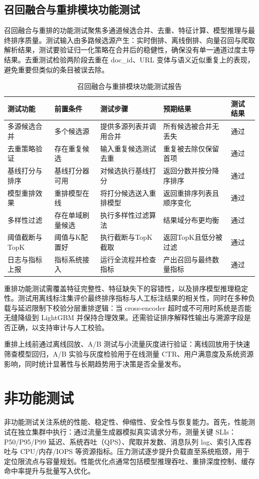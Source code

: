\subsection{召回融合与重排模块功能测试}
召回融合与重排的功能测试聚焦多通道候选合并、去重、特征计算、模型推理与最终排序质量。测试输入由多路候选源产生：实时倒排、离线倒排、向量召回与爬取解析结果，测试要验证归一化策略在合并后的稳健性，确保没有单一通道过度主导结果。去重测试检验两阶段去重在 doc\_id、URL 变体与语义近似重复上的表现，避免重要但类似的条目被误去除。
\begin{table}[htb]
\centering
\caption{召回融合与重排模块功能测试报告}
\label{tab:recall-rerank-test-brief}
{\renewcommand{\arraystretch}{1.2}
\begin{tabular}{p{3cm} p{2cm} p{2cm} p{3cm} p{2cm}}
\hline
测试功能 & 前置条件 & 测试步骤 & 预期结果 & 测试结果 \\
\hline
多源候选合并 & 多个候选源 & 提供多源列表并调用合并 & 所有候选被合并无丢失 & 通过 \\\hline
去重策略验证 & 存在重复候选 & 输入重复候选测试去重 & 重复被去除仅保留首项 & 通过 \\\hline
基线打分与排序 & 基线打分器可用 & 对候选执行基线打分 & 返回分数并按分降序排序 & 通过 \\\hline
模型重排效果 & 重排模型在线 & 将打分候选送入重排模型 & 返回重排序列表且顺序变化 & 通过 \\\hline
多样性过滤 & 存在单域刷量候选 & 执行多样性过滤算法 & 结果域分布更均衡 & 通过 \\\hline
阈值截断与TopK & 阈值与K配置好 & 执行截断与TopK截取 & 返回TopK且低分被过滤 & 通过 \\\hline
日志与指标上报 & 指标系统接入 & 运行全流程并检查指标 & 产出召回与最终数量指标 & 通过 \\\hline
\end{tabular}
}
\end{table}
重排功能测试需覆盖特征完整性、特征缺失下的容错性，以及排序模型推理稳定性。测试用离线标注集评价最终排序指标与人工标注结果的相关性，同时在多种负载与延迟限制下校验分层重排逻辑：当 cross-encoder 超时或不可用时系统是否能无缝降级到 LightGBM 并保持合理效果。还需验证排序解释性输出与溯源字段是否正确，以支持审计与人工校验。

重排上线前通过离线回放、A/B 测试与小流量灰度进行验证：离线回放用于快速筛查模型回归，A/B 实验与灰度检验用于在线测量 CTR、用户满意度及系统资源影响，同时统计显著性与长期趋势用于决策是否全量发布。
\section{非功能测试}
非功能测试关注系统的性能、稳定性、伸缩性、安全性与恢复能力。首先，性能测试在独立集群中执行：通过流量生成器模拟真实请求分布，测量关键 SLIs：P50/P95/P99 延迟、系统吞吐（QPS）、爬取并发数、消息队列 lag、索引入库吞吐与 CPU/内存/IOPS 等资源指标。压力测试逐步提升负载直至系统瓶颈，用于定位限流点与容量规划。性能优化点通常包括模型推理吞吐、重排深度控制、缓存命中率提升与批量写入优化。

